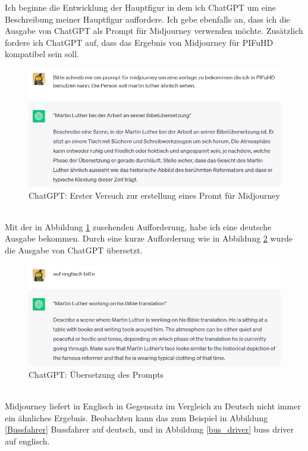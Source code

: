 \documentclass[10pt,a4paper,bibliography=totocnumbered,listof=totocnumbered]{scrartcl}
\begin{document}
Ich beginne die Entwicklung der Hauptfigur in dem ich ChatGPT um eine Beschreibung meiner Hauptfigur auffordere. Ich gebe ebenfalls an, dass ich die Ausgabe von ChatGPT als Prompt für Midjourney verwenden möchte. Zusätzlich fordere ich ChatGPT auf, dass das Ergebnis von Midjourney für PIFuHD kompatibel sein soll.
\begin{figure}[h]
 	\centering
\includegraphics[width=14cm]{BilderFuerBA/CGPTMidJourneyMartinLuther/02.png}
        	\caption{ChatGPT: Erster Versuch zur erstellung eines Promt für Midjourney}
        	\label{ChatGPT_erster_Versuch_Midjourney_Promt}
\end{figure}
\\
Mit der in Abbildung \ref{ChatGPT_erster_Versuch_Midjourney_Promt} zusehenden Aufforderung, habe ich eine deutsche Ausgabe bekommen. Durch eine kurze Aufforderung wie in Abbildung \ref{ChatGPT_übersetzen} wurde die Ausgabe von ChatGPT übersetzt.
\begin{figure}[h]
	\centering
	\includegraphics[width=14cm]{BilderFuerBA/CGPTMidJourneyMartinLuther/03.png}
	\caption{ChatGPT: Übersetzung des Prompts}
	\label{ChatGPT_übersetzen}
\end{figure}
\\
Midjourney liefert in Englisch in Gegensatz im Vergleich zu Deutsch nicht immer ein ähnliches Ergebnis. Beobachten kann das zum Beispiel in Abbildung \ref{Bussfahrer} Bussfahrer auf deutsch, und in Abbildung \ref{bus_driver} buss driver auf englisch.
\end{document}
